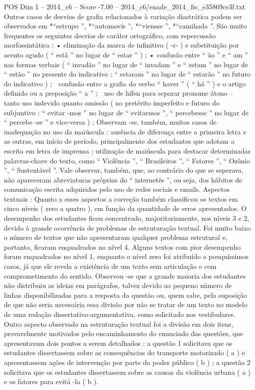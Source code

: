 \begin{textsample}{POS Dim 1 – 2014\_c6 – Score -7.00 – 2014\_c6/enade\_2014\_fis\_e35869ce3f.txt}
Outros casos de desvios de grafia relacionados à variação diastrática podem ser observados em *“estrupo ”, *“automovís ”, *“viensse ”, *“camihada ”.
São muito frequentes os seguintes desvios de caráter ortográfico, com repercussão morfossintática : • eliminação da marca de infinitivo ( -r- ) e substituição por acento agudo ( “ está ” no lugar de “ estar ” ) ; • confusão entre “ ão ” e “ am ” nas formas verbais ( “ invadão ” no lugar de “ invadam ” e “ estam ” no lugar de “ estão ” no presente do indicativo ; “ estaram ” no lugar de “ estarão ” no futuro do indicativo ) ;  confusão entre a grafia do verbo “ haver ” ( “ há ” ) e o artigo definido ou a preposição “ a ” ;  uso de hífen para separar pronome átono – tanto uso indevido quanto omissão ( no pretérito imperfeito e futuro do subjuntivo : “ evitar -mos ” no lugar de “ evitarmos ”, “ percebesse ” no lugar de “ percebe -se ” e vice-versa ) ; Observam -se, também, muitos casos de inadequação no uso da maiúscula : ausência de diferença entre a primeira letra e as outras, em início de período, principalmente dos estudantes que adotam a escrita em letra de imprensa ; utilização de maiúscula para destacar determinadas palavras-chave do texto, como “ Violência ”, “ Brasileiros ”, “ Fatores ”, “ Ozônio ”, “ Sustentável ”.
Vale observar, também, que, ao contrário do que se esperava, não apareceram abreviaturas próprias do “ internetês ”, ou seja, dos hábitos de comunicação escrita adquiridos pelo uso de redes sociais e emails.
Aspectos textuais : Quanto a esses aspectos a correção também classificou os textos em cinco níveis ( zero a quatro ), em função da quantidade de erros apresentados.
O desempenho dos estudantes ficou concentrado, majoritariamente, nos níveis 3 e 2, devido à grande ocorrência de problemas de estruturação textual.
Foi muito baixo o número de textos que não apresentaram qualquer problema estrutural e, portanto, ficaram enquadrados no nível 4.
Alguns textos com pior desempenho foram enquadrados no nível 1, enquanto o nível zero foi atribuído a pouquíssimos casos, já que ele revela a existência de um texto sem articulação e com comprometimento do sentido.
Observou -se que a grande maioria dos estudantes não distribuiu as ideias em parágrafos, talvez devido ao pequeno número de linhas disponibilizadas para a resposta da questão ou, quem sabe, pela suposição de que não seria necessária essa divisão por não se tratar de um texto no modelo de uma redação dissertativo-argumentativa, como solicitado nos vestibulares.
Outro aspecto observado na estruturação textual foi a divisão em dois itens, provavelmente motivados pelo encaminhamento do enunciado das questões, que apresentavam dois pontos a serem detalhados : a questão 1 solicitava que os estudantes dissertassem sobre as consequências do transporte motorizado ( a ) e apresentassem ações de intervenção por parte do poder público ( b ) ; a questão 2 solicitava que os estudantes dissertassem sobre as causas da violência urbana ( a ) e os fatores para evitá -la ( b ).

\end{textsample}
